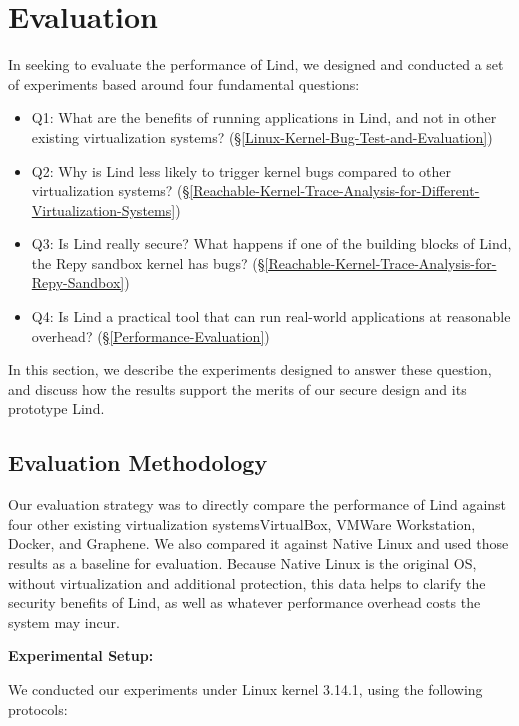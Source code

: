 \section{Evaluation}
\label{sec.evaluation}

In seeking to evaluate the performance of Lind, 
we designed and conducted a set of experiments based around four
fundamental 
questions:

\begin{itemize}
\item Q1: What are the benefits of running applications in Lind, 
and not in other existing virtualization systems?
(\S{\ref{Linux-Kernel-Bug-Test-and-Evaluation}})

\item Q2: Why is Lind less likely to trigger kernel bugs compared to 
other virtualization systems?
(\S{\ref{Reachable-Kernel-Trace-Analysis-for-Different-Virtualization-Systems}})

\item Q3: Is Lind really secure? What happens if one of the building blocks
of Lind, 
the Repy sandbox kernel has bugs?
(\S{\ref{Reachable-Kernel-Trace-Analysis-for-Repy-Sandbox}})

\item Q4: Is Lind a practical tool that can run real-world applications at
reasonable overhead? 
(\S{\ref{Performance-Evaluation}})
\end{itemize}

In this section, we describe the experiments designed to answer these
question, 
and discuss how the results support the merits of our secure design and its
prototype Lind. 

\subsection{Evaluation Methodology}

Our evaluation strategy was to directly compare the performance of Lind
against 
four other existing virtualization systems\textendash VirtualBox, VMWare
Workstation, 
Docker, and Graphene. We also compared it against Native Linux and used 
those results as a baseline for evaluation. Because Native Linux is the
original OS, 
without virtualization and additional protection, this data helps to
clarify the security benefits of Lind, 
as well as whatever performance overhead costs the system may incur.

\textbf{Experimental Setup:}

We conducted our experiments under Linux kernel 3.14.1, using the following
protocols:

